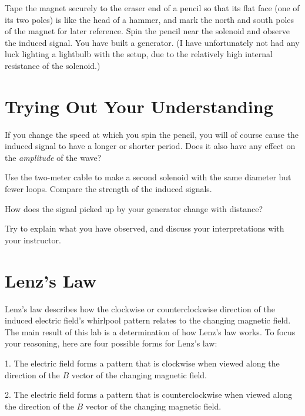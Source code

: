 
Tape the magnet securely to the eraser end of a pencil so
that its flat face (one of its two poles) is like the head
of a hammer, and mark the north and south poles of the
magnet for later reference. Spin the pencil near the
solenoid and observe the induced signal. You have built a
generator. (I have unfortunately not had any luck lighting a
lightbulb with the setup, due to the relatively high
internal resistance of the solenoid.)

\section*{Trying Out Your Understanding}


If you change the speed at which you spin the pencil, you
will of course cause the induced signal to have a longer or
shorter period. Does it also have any effect on the
\emph{amplitude} of the wave?


Use the two-meter cable to make a second solenoid with the
same diameter but fewer loops. Compare the strength of the
induced signals.


How does the signal picked up by your generator change with distance?

Try to explain what you have observed, and discuss your
interpretations with your instructor.

\section*{Lenz's Law}

Lenz's law describes how the clockwise or counterclockwise
direction of the induced electric field's whirl\-pool pattern
relates to the changing magnetic field. The main result of
this lab is a determination of how Lenz's law works. To
focus your reasoning, here are four possible forms for Lenz's law:

1. The electric field forms a pattern that is clockwise when
viewed along the direction of the $B$ vector of the
changing magnetic field.

2. The electric field forms a pattern that is counterclockwise
when viewed along the direction of the $B$ vector of the
changing magnetic field.

